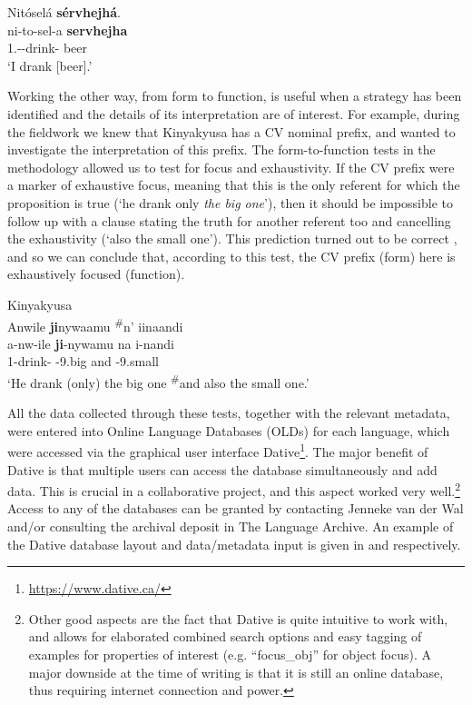 \documentclass[output=paper]{langscibook}
\begin{document}
\ex
\label{bkm:Ref117865183:b}
Nitóselá \textbf{sérvhejhá}.\\
\gll
ni-to-sel-a  \textbf{servhejha}\\
1\SG.\SM-\TO{}-drink-\FV{}  beer\\
\glt
‘I drank [beer]\textsubscript{\FOC}.’\\


\z
\z

Working the other way, from form to function, is useful when a strategy has been identified and the details of its interpretation are of interest. For example, during the fieldwork we knew that Kinyakyusa has a CV nominal prefix, and wanted to investigate the interpretation of this prefix. The form-to-function tests in the methodology allowed us to test for focus and exhaustivity. If the CV prefix were a marker of exhaustive focus, meaning that this is the only referent for which the proposition is true (‘he drank only \textit{the big one}’), then it should be impossible to follow up with a clause stating the truth for another referent too and cancelling the exhaustivity (‘also the small one’). This prediction turned out to be correct , and so we can conclude that, according to this test, the CV prefix (form) here is exhaustively focused (function).
\largerpage[2]

\ea
Kinyakyusa \citep[335]{vanderWalLusekelo2022}\\
\label{bkm:Ref117864379}Anwile \textbf{ji}nywaamu \textsuperscript{\#}n’ iinaandi\\
\gll
a-nw-ile  \textbf{ji}{}-nywamu  na  i-nandi\\
1\SM{}-drink-\PFV{}  \textbf{\EXH{}}{}-9.big  and  \AUG{}-9.small\\
\glt
‘He drank (only) the big one \textsuperscript{\#}and also the small one.’\\


\z

All the data collected through these tests, together with the relevant metadata, were entered into Online Language Databases (OLDs) for each language, which were accessed via the graphical user interface Dative\footnote{\url{https://www.dative.ca/}}. The major benefit of Dative is that multiple users can access the database simultaneously and add data. This is crucial in a collaborative project, and this aspect worked very well.\footnote{Other good aspects are the fact that Dative is quite intuitive to work with, and allows for elaborated combined search options and easy tagging of examples for properties of interest (e.g. “focus\_obj” for object focus). A major downside at the time of writing is that it is still an online database, thus requiring internet connection and power.} Access to any of the databases can be granted by contacting Jenneke van der Wal and/or consulting the archival deposit in The Language Archive. An example of the Dative database layout and data/metadata input is given in  and  respectively.
\end{document}
